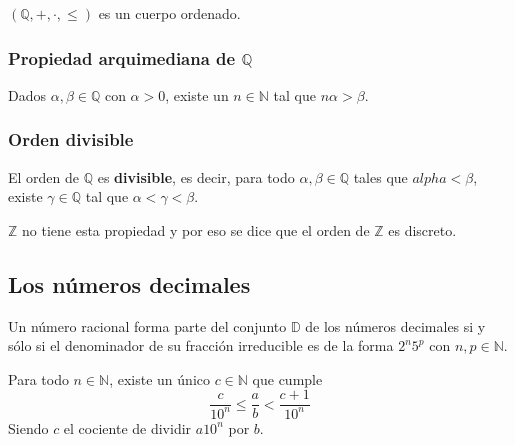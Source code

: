 $(\mathbb{Q},+,\cdot,\leq)$ es un cuerpo ordenado.

\subsubsection{Propiedad arquimediana de $\mathbb{Q}$}

Dados $\alpha,\beta \in \mathbb{Q}$ con $\alpha > 0 $, existe un $n \in \mathbb{N}$ tal que $n\alpha > \beta$.

\subsubsection{Orden divisible}

El orden de $\mathbb{Q}$ es \textbf{divisible}, es decir, para todo $\alpha,\beta \in \mathbb{Q}$ tales que $alpha < \beta$, existe $\gamma \in \mathbb{Q}$ tal que $\alpha < \gamma < \beta$.

$\mathbb{Z}$ no tiene esta propiedad y  por eso se dice que el orden de $\mathbb{Z}$ es discreto.

\subsection{Los números decimales}

Un número racional forma parte del conjunto $\mathbb{D}$ de los números decimales si y sólo si el denominador de su fracción irreducible es de la forma $2^n5^p$ con $n,p \in \mathbb{N}$.

Para todo $n \in \mathbb{N}$, existe un único $c \in \mathbb{N}$ que cumple
\[
\frac{c}{10^n} \leq \frac{a}{b} < \frac{c+1}{10^n}
\]
Siendo $c$ el cociente de dividir $a10^n$ por $b$.
